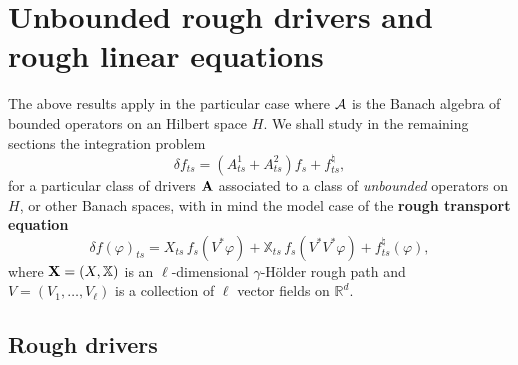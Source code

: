 \documentclass[11pt,a4paper]{amsart}
\newcommand{\RR}{\mathbb{R}}  \newcommand{\CC}{\mathbb{C}}  \newcommand{\LL}{\mathbb{L}}  \newcommand{\WW}{\mathbb{W}}
\newcommand{\bbX}{\mathbb{X}}
\theoremstyle{plain}%
\theoremstyle{definition}
\theoremstyle{remark}
\numberwithin{equation}{section} %
\begin{document}
\medskip



\section{Unbounded rough drivers and rough linear equations}
\label{SectionUnboundedRoughDrivers}

The above results apply in the particular case where $\mathcal{A}$ is the Banach algebra of bounded operators on an Hilbert space $H$. We shall study in the remaining sections the integration problem 
\begin{equation}
\label{EqLinearEquationHilbert}
\delta f_{ts} = (A^1_{ts} + A^2_{ts}) f_s +  f^\natural_{ts},
\end{equation}
for a particular class of drivers $\bf A$ associated to a class of \textit{unbounded} operators on $H$, or other Banach spaces, with in mind the model case of the \textbf{rough transport equation}
$$
\delta f(\varphi)_{ts} = X_{ts}\,f_s(V^*\varphi) +  \bbX_{ts}\,f_s(V^*V^*\varphi) + f^\natural_{ts}(\varphi),
$$
where ${\bfX} = (X,\bbX)$ is an $\ell$-dimensional $\gamma$-H\"older rough path and $V = (V_1,\dots,V_\ell)$ is a collection of $\ell$ vector fields on $\RR^d$.



\subsection{Rough drivers}
\label{SubsectionRoughDrivers}
\end{document}
